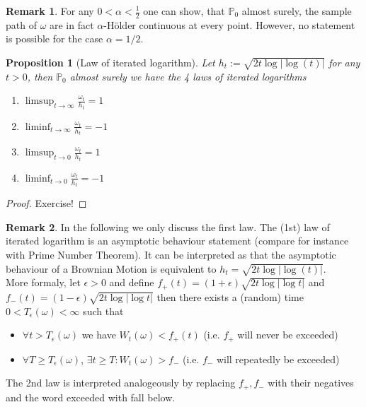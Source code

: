 \documentclass[11pt,a4paper, final]{article}
\newtheorem{prop}{Proposition}[section]
\theoremstyle{definition}
\newtheorem{rem}{Remark}[section]
\begin{document}
\begin{rem} For any $0<\alpha < \frac{1}{2}$ one can show, that $\mathbb{P}_0$ almost surely, the sample path of $\omega$ are in fact $\alpha$-Hölder continuous at every point. However, no statement is possible for the case $ \alpha = 1/2$. 
\end{rem}
\begin{prop}[Law of iterated logarithm] Let $h_t:= \sqrt{ 2t \log | \log(t)|}$ for any $t>0$, then $\mathbb{P}_0$ almost surely we have the 4 laws of iterated logarithms
\begin{enumerate}
\item $\limsup_{t \to \infty} \frac{\omega_t}{h_t}  = 1  $
\item $\liminf_{t \to \infty} \frac{\omega_t}{h_t} = -1$ 
\item $\limsup_{t \to 0} \frac{\omega_t}{h_t}=1 $
\item $\liminf_{t \to 0} \frac{\omega_t}{h_t} = -1 $

\end{enumerate}

\end{prop}
\begin{proof}
Exercise! 
\end{proof}
\begin{rem} In the following we only discuss the first law. The (1st) law of iterated logarithm is an asymptotic behaviour statement (compare for instance with Prime Number Theorem). It can be interpreted as that the asymptotic behaviour of a Brownian Motion is equivalent to $h_t = \sqrt{2t  \log|\log (t)|}$.
\\
More formaly, let $\epsilon >0$ and define $f_+(t)= (1 + \epsilon)\sqrt{2t \log | \log t|}$ and $f_-(t) = (1-\epsilon) \sqrt{2t \log | \log t |}$ then there exists a (random) time $0< T_\epsilon (\omega)< \infty$ such that \begin{itemize}
\item $ \forall t > T_\epsilon (\omega)$ we have $W_t(\omega)< f_+(t)$ (i.e. $f_+$ will never be exceeded)
\item $\forall T \geq T_\epsilon (\omega)$, $\exists t \geq T: W_t( \omega) > f_-$ (i.e. $f_-$ will repeatedly be exceeded)
\end{itemize}
The 2nd law is interpreted analogeously by replacing $f_+,f_-$ with their negatives and the word exceeded with fall below.
\end{rem}
\newpage
\end{document}
